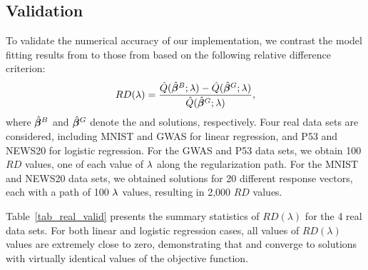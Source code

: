 \subsection{Validation}

To validate the numerical accuracy of our implementation, we contrast the model fitting results from  to those from  based on the following relative difference criterion:
\begin{equation} \label{criterion}
RD(\lambda) = \frac{\hat{Q}(\hat{\boldsymbol{\beta}}^B; \lambda) - \hat{Q}(\hat{\boldsymbol{\beta}}^G; \lambda)}{\hat{Q}(\hat{\boldsymbol{\beta}}^G; \lambda)},
\end{equation}
where $\hat{\boldsymbol{\beta}}^B$ and $\hat{\boldsymbol{\beta}}^G$ denote the  and  solutions, respectively.  Four real data sets are considered, including MNIST and GWAS for linear regression, and P53 and NEWS20 for logistic regression. For the GWAS and P53 data sets, we obtain 100 $RD$ values, one of each value of $\lambda$ along the regularization path.  For the MNIST and NEWS20 data sets, we obtained solutions for 20 different response vectors, each with a path of 100 $\lambda$ values, resulting in 2,000 $RD$ values.


Table~\ref{tab_real_valid} presents the summary statistics of $RD(\lambda)$ for the 4 real data sets. For both linear and logistic regression cases, all values of $RD(\lambda)$ values are extremely close to zero, demonstrating that  and  converge to solutions with virtually identical values of the objective function.

